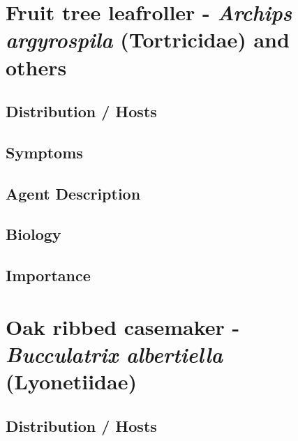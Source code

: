 \documentclass[
]{book}
\begin{document}
\section*{\texorpdfstring{Fruit tree leafroller - \emph{Archips argyrospila} (Tortricidae) and others}{Fruit tree leafroller - Archips argyrospila (Tortricidae) and others}}\label{fruit-tree-leafroller---archips-argyrospila-tortricidae-and-others}

\subsection*{Distribution / Hosts}\label{distribution-hosts-5}

\subsection*{Symptoms}\label{symptoms-5}

\subsection*{Agent Description}\label{agent-description-5}

\subsection*{Biology}\label{biology-5}

\subsection*{Importance}\label{importance-5}

\section*{\texorpdfstring{Oak ribbed casemaker - \emph{Bucculatrix albertiella} (Lyonetiidae)}{Oak ribbed casemaker - Bucculatrix albertiella (Lyonetiidae)}}\label{oak-ribbed-casemaker---bucculatrix-albertiella-lyonetiidae}

\subsection*{Distribution / Hosts}\label{distribution-hosts-6}
\end{document}
